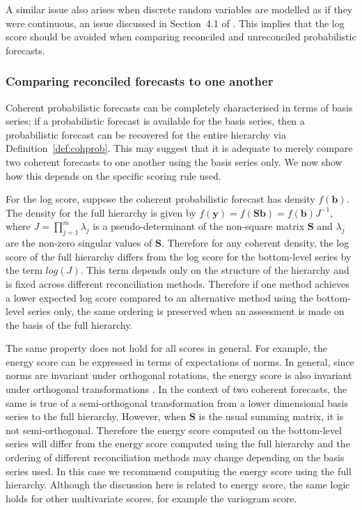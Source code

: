 \documentclass[a4paper, 11pt]{article}
\theoremstyle{definition}
\begin{document}
A similar issue also arises when discrete random variables are modelled as if they were continuous, an issue discussed in Section~4.1 of \citet{Gneiting2007}. This implies that the log score should be avoided when comparing reconciled and unreconciled probabilistic forecasts.

\subsubsection{Comparing reconciled forecasts to one another}

Coherent probabilistic forecasts can be completely characterised in terms of basis series; if a probabilistic forecast is available for the basis series, then a probabilistic forecast can be recovered for the entire hierarchy via Definition~\ref{def:cohprob}. This may suggest that it is adequate to merely compare two coherent forecasts to one another using the basis series only. We now show how this depends on the specific scoring rule used.

For the log score, suppose the coherent probabilistic forecast has density $f(\bm{b})$. The density for the full hierarchy is given by $f(\bm{y})=f(\bm{Sb})=f(\bm{b})J^{-1}$, where $J=\prod_{j=1}^{m}\lambda_j$ is a pseudo-determinant of the non-square matrix $\bm{S}$ and $\lambda_j$ are the non-zero singular values of $\bm{S}$. Therefore for any coherent density, the log score of the full hierarchy differs from the log score for the bottom-level series by the term $log(J)$. This term depends only on the structure of the hierarchy and is fixed across different reconciliation methods. Therefore if one method achieves a lower expected log score compared to an alternative method using the bottom-level series only, the same ordering is preserved when an assessment is made on the basis of the full hierarchy.

The same property does not hold for all scores in general. For example, the energy score can be expressed in terms of expectations of norms. In general, since norms are invariant under orthogonal rotations, the energy score is also invariant under orthogonal transformations \citep{Szekely2013,Gneiting2007}. In the context of two coherent forecasts, the same is true of a semi-orthogonal transformation from a lower dimensional basis series to the full hierarchy. However, when $\bm{S}$ is the usual summing matrix, it is not semi-orthogonal. Therefore the energy score computed on the bottom-level series will differ from the energy score computed using the full hierarchy and the ordering of different reconciliation methods may change depending on the basis series used. In this case we recommend computing the energy score using the full hierarchy. Although the discussion here is related to energy score, the same logic holds for other multivariate scores, for example the variogram score.
\end{document}
